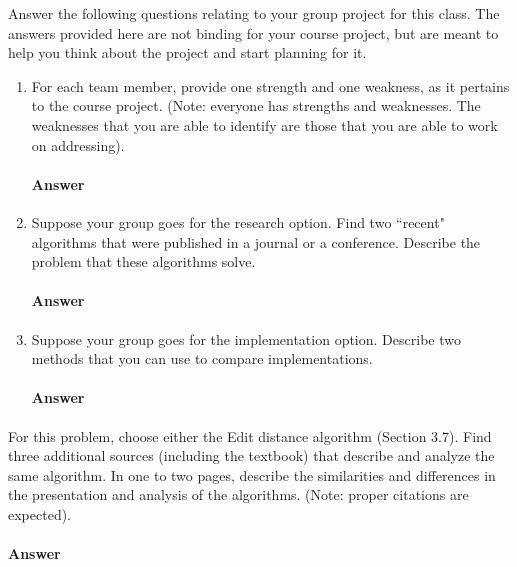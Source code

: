 \documentclass{article}
\begin{document}
Answer the following questions relating to your group project for this class.
The answers provided here are not binding for your course project, but are meant
to help you think about the project and start planning for it.

\begin{enumerate}

    \item For each team member, provide one strength and one weakness, as it
        pertains to the course project.  (Note: everyone has strengths and
        weaknesses.  The weaknesses that you are able to identify are those that
        you are able to work on addressing).

        \paragraph{Answer}
        \todo{}

    \item Suppose your group goes for the research option.  Find two ``recent"
        algorithms that were published in a journal or a conference.  Describe
        the problem that these algorithms solve.

        \paragraph{Answer}
        \todo{}

    \item Suppose your group goes for the implementation option. Describe two
        methods that you can use to compare implementations.

        \paragraph{Answer}
        \todo{}

\end{enumerate}


\collab{\todo{}}

For this problem, choose either the Edit distance algorithm (Section 3.7).
Find three additional sources (including the
textbook) that describe
and analyze the same algorithm. In one to two pages, describe the similarities
and differences in the presentation and analysis of the algorithms. (Note:
proper citations are expected).

\paragraph{Answer}
\todo{}
\end{document}
